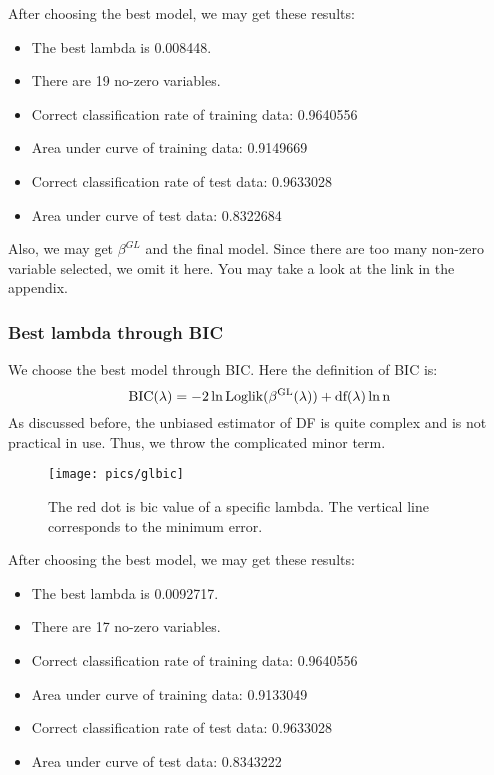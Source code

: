\documentclass[]{article}
\begin{document}
After choosing the best model, we may get these results:
\begin{itemize}
	\item The best lambda is 0.008448.
	\item There are 19 no-zero variables.
	\item Correct classification rate of training data: 0.9640556
	\item Area under curve of training data: 0.9149669
	\item Correct classification rate of test data: 0.9633028
	\item Area under curve of test data: 0.8322684
\end{itemize}

Also, we may get $ \beta^{GL} $ and the final model. Since there are too many non-zero variable selected, we omit it here. You may take a look at the link in the appendix.


\subsubsection{Best lambda through BIC}
We choose the best model through BIC. Here the definition of BIC is:
\begin{equation}
\rm BIC(\lambda)=-2\ln \rm Loglik(\beta^{GL}(\lambda))+\rm df(\lambda) \ln n
\end{equation}
As discussed before, the unbiased estimator of DF is quite complex and is not practical in use. Thus, we throw the complicated minor term.
\begin{figure}[H]
	\centering
	\texttt{[image: pics/glbic]}
	\caption{The red dot is bic value of a specific lambda. The vertical line corresponds to the minimum error.\label{fig=glbic}}
\end{figure}

After choosing the best model, we may get these results:
\begin{itemize}
	\item The best lambda is 0.0092717.
	\item There are 17 no-zero variables.
	\item Correct classification rate of training data: 0.9640556
	\item Area under curve of training data: 0.9133049
	\item Correct classification rate of test data: 0.9633028
	\item Area under curve of test data: 0.8343222
\end{itemize}
\end{document}
